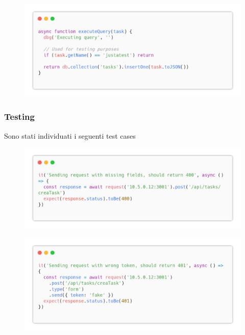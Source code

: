 \documentclass{report}
\begin{document}
\begin{figure}[H]
	\centering\includegraphics[width=1\textwidth]{images/code_crea_task4.png}
\end{figure}

\subsubsection*{Testing}
Sono stati individuati i seguenti test cases
\begin{figure}[H]
	\centering\includegraphics[width=1\textwidth]{images/code_crea_task_test1.png}
\end{figure}
\begin{figure}[H]
	\centering\includegraphics[width=1\textwidth]{images/code_crea_task_test2.png}
\end{figure}
\end{document}
